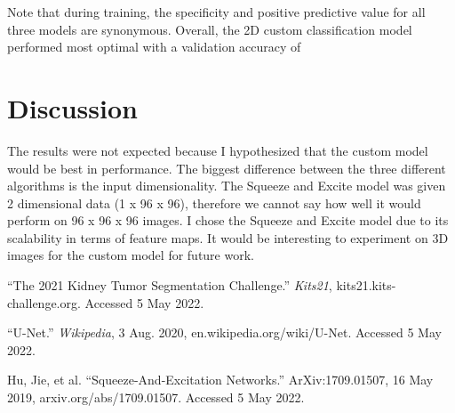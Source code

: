 \documentclass [12pt, letterpaper] {article}
\begin{document}
Note that during training, the specificity and positive predictive value for all three models are synonymous. Overall, the 2D custom classification model performed most optimal with a validation accuracy of 

\section{Discussion}
The results were not expected because I hypothesized that the custom model would be best in performance. The biggest difference between the three different algorithms is the input dimensionality. The Squeeze and Excite model was given 2 dimensional data (1 x 96 x 96), therefore we cannot say how well it would perform on 96 x 96 x 96 images. I chose the Squeeze and Excite model due to its scalability in terms of feature maps. It would be interesting to experiment on 3D images for the custom model for future work. 


\begin{thebibliography}{2}
“The 2021 Kidney Tumor Segmentation Challenge.” \emph{Kits21}, kits21.kits-challenge.org. Accessed 5 May 2022.

“U-Net.” \emph{Wikipedia}, 3 Aug. 2020, en.wikipedia.org/wiki/U-Net. Accessed 5 May 2022.

Hu, Jie, et al. “Squeeze-And-Excitation Networks.” ArXiv:1709.01507, 16 May 2019, arxiv.org/abs/1709.01507. Accessed 5 May 2022.
\end{thebibliography}
\end{document}
